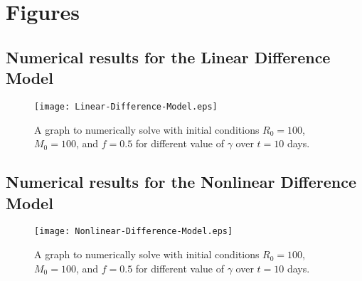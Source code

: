 \section{Figures}\label{sec:figures}

\subsection{Numerical results for the Linear Difference Model}
\begin{figure}[H] 
    \centering
    \texttt{[image: Linear-Difference-Model.eps]}
    \caption{A graph to numerically solve  with initial conditions $R_0=100$, $M_0=100$, and $f=0.5$ for different value of $\gamma$ over $t=10$ days.}
    \label{fig:1}
\end{figure}

\subsection{Numerical results for the Nonlinear Difference Model}
\begin{figure}[H] 
    \centering
    \texttt{[image: Nonlinear-Difference-Model.eps]}
    \caption{A graph to numerically solve  with initial conditions $R_0=100$, $M_0=100$, and $f=0.5$ for different value of $\gamma$ over $t=10$ days.}
    \label{fig:2}
\end{figure}